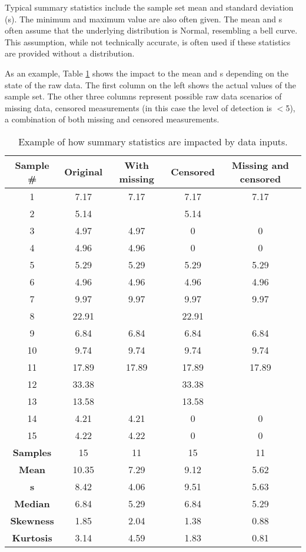 Typical summary statistics include the sample set mean and standard deviation (s). The minimum and maximum value are also often given. The mean and s often assume that the underlying distribution is Normal, resembling a bell curve. This assumption, while not technically accurate, is often used if these statistics are provided without a distribution.

As an example, Table \ref{tab:diffdata} shows the impact to the mean and s depending on the state of the raw data. The first column on the left shows the actual values of the sample set. The other three columns represent possible raw data scenarios of missing data, censored measurements (in this case the level of detection is $<$5), a combination of both missing and censored measurements. 

\begin{table}[!htpb]
\centering
\caption{Example of how summary statistics are impacted by data inputs.}
\label{tab:diffdata}
\begin{tabular}{@{}ccccc@{}}
\toprule
\textbf{Sample \#} & \textbf{Original} & \textbf{With missing} & \textbf{Censored} & \textbf{Missing and censored} \\ \midrule
1 & 7.17 & 7.17 & 7.17 & 7.17 \\
2 & 5.14 &  & 5.14 &  \\
3 & 4.97 & 4.97 & 0 & 0 \\
4 & 4.96 & 4.96 & 0 & 0 \\
5 & 5.29 & 5.29 & 5.29 & 5.29 \\
6 & 4.96 & 4.96 & 4.96 & 4.96 \\
7 & 9.97 & 9.97 & 9.97 & 9.97 \\
8 & 22.91 &  & 22.91 &  \\
9 & 6.84 & 6.84 & 6.84 & 6.84 \\
10 & 9.74 & 9.74 & 9.74 & 9.74 \\
11 & 17.89 & 17.89 & 17.89 & 17.89 \\
12 & 33.38 &  & 33.38 &  \\
13 & 13.58 &  & 13.58 &  \\
14 & 4.21 & 4.21 & 0 & 0 \\
15 & 4.22 & 4.22 & 0 & 0 \\ \midrule
\textbf{Samples} & 15 & 11 & 15 & 11 \\
\textbf{Mean} & 10.35 & 7.29 & 9.12 & 5.62 \\
\textbf{s} & 8.42 & 4.06 & 9.51 & 5.63 \\
\textbf{Median} & 6.84 & 5.29 & 6.84 & 5.29 \\
\textbf{Skewness} & 1.85 & 2.04 & 1.38 & 0.88 \\
\textbf{Kurtosis} & 3.14 & 4.59 & 1.83 & 0.81 \\ \bottomrule
\end{tabular}
\end{table}

